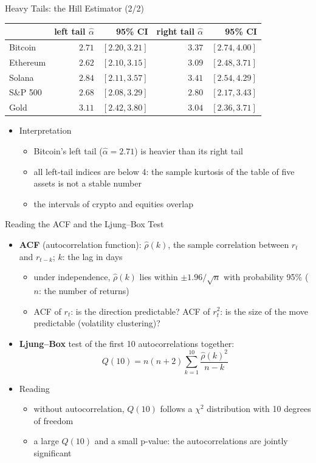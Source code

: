 \begin{frame}{Heavy Tails: the Hill Estimator (2/2)}
\itemsize{\footnotesize}
\begin{center}
\scriptsize
\begin{tabular}{lrrrr}
\toprule
& left tail $\hat\alpha$ & 95\% CI & right tail $\hat\alpha$ & 95\% CI \\
\midrule
Bitcoin & $2.71$ & $[2.20, 3.21]$ & $3.37$ & $[2.74, 4.00]$ \\
Ethereum & $2.62$ & $[2.10, 3.15]$ & $3.09$ & $[2.48, 3.71]$ \\
Solana & $2.84$ & $[2.11, 3.57]$ & $3.41$ & $[2.54, 4.29]$ \\
S\&P 500 & $2.68$ & $[2.08, 3.29]$ & $2.80$ & $[2.17, 3.43]$ \\
Gold & $3.11$ & $[2.42, 3.80]$ & $3.04$ & $[2.36, 3.71]$ \\
\bottomrule
\end{tabular}
\end{center}
\begin{itemize}
    \item Interpretation
    \begin{itemize}
        \item Bitcoin's left tail ($\hat\alpha = 2.71$) is heavier than its right tail
        \item all left-tail indices are below 4: the sample kurtosis of the table of five assets is not a stable number
        \item the intervals of crypto and equities overlap
    \end{itemize}
\end{itemize}
\end{frame}

\begin{frame}{Reading the ACF and the Ljung--Box Test}
\itemsize{\small}
\begin{itemize}
    \item \textbf{ACF} (autocorrelation function): $\hat\rho(k)$, the sample correlation between $r_t$ and $r_{t-k}$; $k$: the lag in days
    \begin{itemize}
        \item under independence, $\hat\rho(k)$ lies within $\pm 1.96/\sqrt{n}$ with probability 95\% ($n$: the number of returns)
        \item ACF of $r_t$: is the direction predictable? ACF of $r_t^2$: is the size of the move predictable (volatility clustering)?
    \end{itemize}
    \item \textbf{Ljung--Box} test of the first 10 autocorrelations together: \[ Q(10) = n(n + 2)\sum_{k=1}^{10}\frac{\hat\rho(k)^2}{n - k} \]
    \item Reading
    \begin{itemize}
        \item without autocorrelation, $Q(10)$ follows a $\chi^2$ distribution with 10 degrees of freedom
        \item a large $Q(10)$ and a small p-value: the autocorrelations are jointly significant
    \end{itemize}
\end{itemize}
\end{frame}


